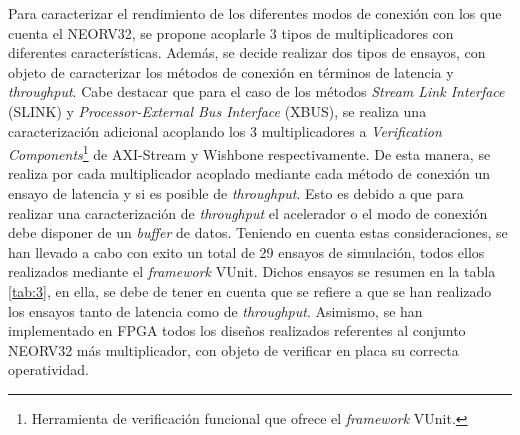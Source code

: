 Para caracterizar el rendimiento de los diferentes modos de conexión con los que cuenta el NEORV32, se propone acoplarle 3 tipos de multiplicadores con diferentes características.
Además, se decide realizar dos tipos de ensayos, con objeto de caracterizar los métodos de conexión en términos de latencia y \textit{throughput}.
Cabe destacar que para el caso de los métodos \textit{Stream Link Interface} (SLINK) y \textit{Processor-External Bus Interface} (XBUS), se realiza una caracterización adicional acoplando los 3 multiplicadores a \textit{Verification Components}\footnote{Herramienta de verificación funcional que ofrece el \textit{framework} VUnit.} de AXI-Stream y Wishbone respectivamente.
De esta manera, se realiza por cada multiplicador acoplado mediante cada método de conexión un ensayo de latencia y si es posible de \textit{throughput}.
Esto es debido a que para realizar una caracterización de \textit{throughput} el acelerador o el modo de conexión debe disponer de un \textit{buffer} de datos.
Teniendo en cuenta estas consideraciones, se han llevado a cabo con exito un total de 29 ensayos de simulación, todos ellos realizados mediante el \textit{framework} VUnit.
Dichos ensayos se resumen en la tabla \ref{tab:3}, en ella, se debe de tener en cuenta que  se refiere a que se han realizado los ensayos tanto de latencia como de \textit{throughput}.
Asimismo, se han implementado en FPGA todos los diseños realizados referentes al conjunto NEORV32 más multiplicador, con objeto de verificar en placa su correcta operatividad.

